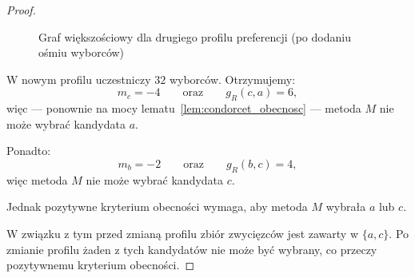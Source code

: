 \documentclass[12pt,a4paper]{mwrep}
\begin{document}
\begin{proof}
\begin{figure}[H]
			
			\caption{Graf większościowy dla drugiego profilu preferencji (po dodaniu ośmiu wyborców)}
			\label{fig:drugi_profil_graf}
			
		\end{figure}
		
		W nowym profilu uczestniczy \(32\) wyborców. Otrzymujemy:
		\[
		m_c = -4
		\qquad \text{oraz} \qquad
		g_R(c,a)=6,
		\]
		więc — ponownie na mocy lematu~\ref{lem:condorcet_obecnosc} — metoda \(M\) nie może wybrać kandydata \(a\).
		
		Ponadto:
		\[
		m_b=-2
		\qquad \text{oraz} \qquad
		g_R(b,c)=4,
		\]
		więc metoda \(M\) nie może wybrać kandydata \(c\).
		
		Jednak pozytywne kryterium obecności wymaga, aby metoda \(M\) wybrała \(a\) lub \(c\). 
		
		W związku z tym przed zmianą profilu zbiór zwycięzców jest zawarty w \(\{a,c\}\).
		Po zmianie profilu żaden z tych kandydatów nie może być wybrany, co przeczy pozytywnemu kryterium obecności.
	\end{proof}
	
\end{document}
